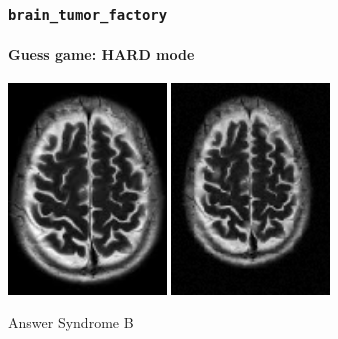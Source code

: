 \documentclass[]{beamer}
\newcommand{\btf}{\tt{brain\_tumor\_factory}}
\begin{document}
\begin{frame}
  \frametitle{\btf}
  \framesubtitle{Guess game: HARD mode}
  \begin{minipage}{\linewidth}
    \begin{center}
      \includegraphics[width=4.2cm]{resources/brain_base}
      \includegraphics[width=4.2cm]{resources/b2}
    \end{center}
  \end{minipage}
  \pause
  \begin{block}{Answer}
    Syndrome B
  \end{block}
\end{frame}
\end{document}
